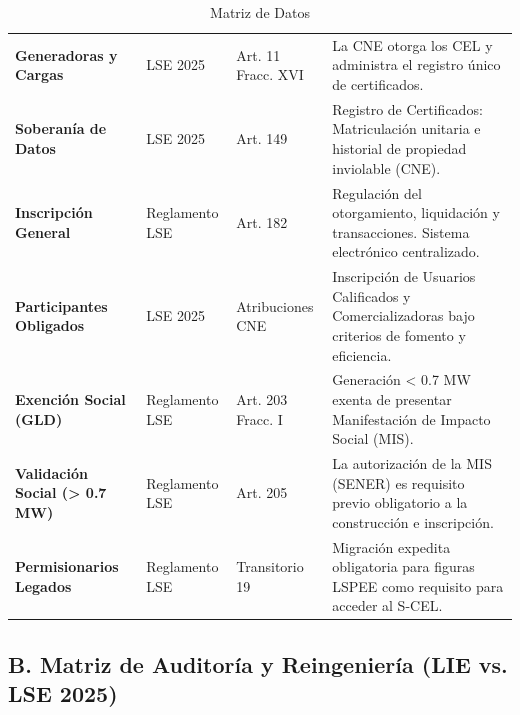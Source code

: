 \documentclass{cel}
\begin{document}
\vspace{0.3cm}
\begin{tabladoradoLargo}
\renewcommand{\tabularxcolumn}[1]{p{#1}}
\begin{xltabular}{\textwidth}{|X|X|X|X|}
\caption{Matriz de Datos} \\
\toprule
{}  &  &  &  \\
\midrule
\endhead
\textbf{Generadoras y Cargas} & LSE 2025 & Art. 11 Fracc. XVI & La CNE otorga los CEL y administra el registro único de certificados. \\ \hline
\textbf{Soberanía de Datos} & LSE 2025 & Art. 149 & Registro de Certificados: Matriculación unitaria e historial de propiedad inviolable (CNE). \\ \hline
\textbf{Inscripción General} & Reglamento LSE & Art. 182 & Regulación del otorgamiento, liquidación y transacciones. Sistema electrónico centralizado. \\ \hline
\textbf{Participantes Obligados} & LSE 2025 & Atribuciones CNE & Inscripción de Usuarios Calificados y Comercializadoras bajo criterios de fomento y eficiencia. \\ \hline
\textbf{Exención Social (GLD)} & Reglamento LSE & Art. 203 Fracc. I & Generación \textless{} 0.7 MW exenta de presentar Manifestación de Impacto Social (MIS). \\ \hline
\textbf{Validación Social (\textgreater{} 0.7 MW)} & Reglamento LSE & Art. 205 & La autorización de la MIS (SENER) es requisito previo obligatorio a la construcción e inscripción. \\ \hline
\textbf{Permisionarios Legados} & Reglamento LSE & Transitorio 19 & Migración expedita obligatoria para figuras LSPEE como requisito para acceder al S-CEL. \\ \hline
\bottomrule
\end{xltabular}
\end{tabladoradoLargo}


\vspace{0.4cm}
\subsection{B. Matriz de Auditoría y Reingeniería (LIE vs. LSE 2025)}
\nopagebreak
\end{document}
